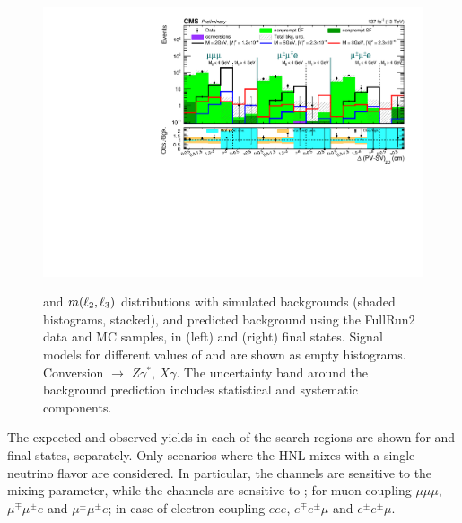 \begin{figure}[h]
   \includegraphics[width=.65\textwidth]{Figures/c6/results/_final/majorana/M-2_V-0p011225_mu_muo_datacard_combined_SR}\\
    \caption{\Deltwod and $m(\ell_2,\ell_3)$ distributions with simulated
      backgrounds (shaded histograms, stacked),
  and predicted background
    using the FullRun2 data and MC samples,
    in \eex (left) and \mmx (right) final states. Signal models for different values of \mhnl and \mixpar
    are shown as empty histograms. Conversion $\rightarrow$
    $Z\gamma^{*}$, $X\gamma$. The uncertainty band around the background prediction includes
    statistical and systematic components.}
     \label{fig:datadriven_2displaced}
\end{figure}

The expected and observed yields in each of the search regions are
shown 
for \eex and \mmx final states, separately.
Only scenarios where the HNL mixes with a single neutrino
flavor are considered.
In particular, the \eex channels are sensitive to the \mixpare mixing
parameter, while the \mmx channels are sensitive to \mixparm; for muon coupling $\mu\mu\mu$,  $\mu^{\mp}\mu^{\pm} e$ 
and $\mu^{\pm}\mu^{\pm}e$; in case of electron coupling $eee$,  $e^{\mp}e^{\pm}\mu$ and $e^{\pm}e^{\pm}\mu$. 
\clearpage
